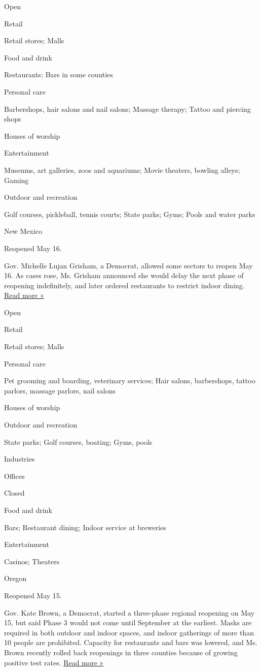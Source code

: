 Open

Retail

Retail stores; Malls

Food and drink

Restaurants; Bars in some counties

Personal care

Barbershops, hair salons and nail salons; Massage therapy; Tattoo and
piercing shops

Houses of worship

Entertainment

Museums, art galleries, zoos and aquariums; Movie theaters, bowling
alleys; Gaming

Outdoor and recreation

Golf courses, pickleball, tennis courts; State parks; Gyms; Pools and
water parks

New Mexico

Reopened May 16.

Gov. Michelle Lujan Grisham, a Democrat, allowed some sectors to reopen
May 16. As cases rose, Ms. Grisham announced she would delay the next
phase of reopening indefinitely, and later ordered restaurants to
restrict indoor dining.
\href{https://www.krqe.com/health/coronavirus-new-mexico/new-mexico-indoor-dining-reopening-plans-criteria-remain-unclear/}{Read
more »}

Open

Retail

Retail stores; Malls

Personal care

Pet grooming and boarding, veterinary services; Hair salons,
barbershops, tattoo parlors, massage parlors, nail salons

Houses of worship

Outdoor and recreation

State parks; Golf courses, boating; Gyms, pools

Industries

Offices

Closed

Food and drink

Bars; Restaurant dining; Indoor service at breweries

Entertainment

Casinos; Theaters

Oregon

Reopened May 15.

Gov. Kate Brown, a Democrat, started a three-phase regional reopening on
May 15, but said Phase 3 would not come until September at the earliest.
Masks are required in both outdoor and indoor spaces, and indoor
gatherings of more than 10 people are prohibited. Capacity for
restaurants and bars was lowered, and Ms. Brown recently rolled back
reopenings in three counties because of growing positive test rates.
\href{https://www.eastoregonian.com/coronavirus/oregon-governor-tightens-virus-restrictions-for-malheur-county/article_a5ba1480-1070-5aab-9732-27a7df8c5df7.html}{Read
more »}

